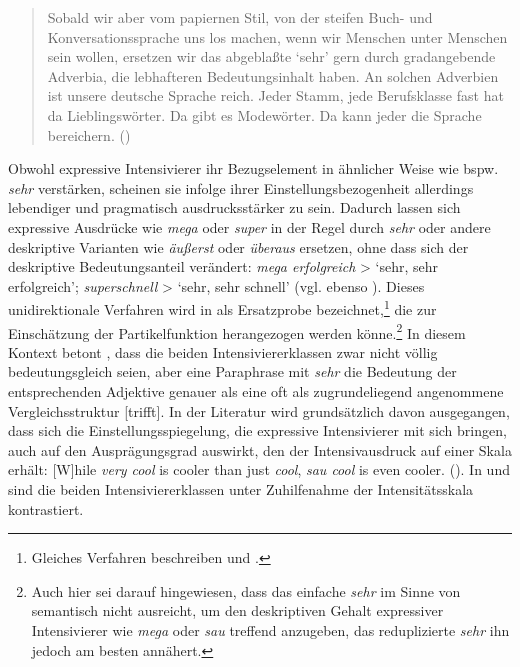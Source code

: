 \begin{quotation} \noindent Sobald wir aber vom papiernen Stil, von der steifen Buch- und Konversationssprache uns los machen, wenn wir Menschen unter Menschen sein wollen, ersetzen wir das abgeblaßte `sehr' gern durch gradangebende Adverbia, die lebhafteren Bedeutungsinhalt haben. An solchen Adverbien ist unsere deutsche Sprache reich. Jeder Stamm, jede Berufsklasse fast hat da Lieblingswörter. Da gibt es Modewörter. Da kann jeder die Sprache bereichern.
\hfill (\mbox{\citealt[266f.]{Becher.1907}}) \end{quotation}

\noindent Obwohl expressive Intensivierer ihr Bezugselement in ähnlicher Weise wie bspw. \textit{sehr} verstärken, scheinen sie infolge ihrer Einstellungsbezogenheit allerdings lebendiger und pragmatisch ausdrucksstärker zu sein. Dadurch lassen sich expressive Ausdrücke wie \textit{mega} oder \textit{super} in der Regel durch \textit{sehr} oder andere deskriptive Varianten wie \textit{äußerst} oder \textit{überaus} ersetzen, ohne dass sich der deskriptive Bedeutungsanteil verändert: \textit{mega erfolgreich} > `sehr, sehr erfolgreich'; {\textit{superschnell} > `sehr, sehr schnell'} (vgl. ebenso {}). Dieses unidirektionale Verfahren wird in \citet[191]{Wellmann.1978} als \glqq{}Ersatzprobe\grqq{} bezeichnet,\footnote{Gleiches Verfahren beschreiben \citet[142]{Suscinskij.1981} und \citet[110f.]{Erben.2006}.} die zur Einschätzung der Partikelfunktion herangezogen werden könne.\footnote{Auch hier sei darauf hingewiesen, dass das einfache \textit{sehr} im Sinne von \citet[133]{Gutzmann.2019a} semantisch nicht ausreicht, um den deskriptiven Gehalt expressiver Intensivierer wie \textit{mega} oder \textit{sau} treffend anzugeben, das reduplizierte \textit{sehr} ihn jedoch am besten annähert.} In diesem Kontext betont {\citet[228]{Pittner.1989}}, dass die beiden Intensiviererklassen zwar nicht völlig bedeutungsgleich seien, aber \glqq{}eine Paraphrase mit \textit{sehr} die Bedeutung der entsprechenden Adjektive genauer als eine oft als zugrundeliegend angenommene Vergleichsstruktur [trifft].\grqq{}
In der Literatur wird grundsätzlich davon ausgegangen, dass sich die Einstellungsspiegelung, die expressive Intensivierer mit sich bringen, auch auf den Ausprägungsgrad auswirkt, den der Intensivausdruck auf einer Skala erhält: \glqq{}[W]hile \textit{very cool} is cooler than just \textit{cool}, \textit{sau cool} is even cooler.\grqq{} ({\citealt[133]{Gutzmann.2019a}}). In  und  sind die beiden Intensiviererklassen unter Zuhilfenahme der Intensitätsskala kontrastiert.

